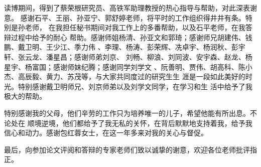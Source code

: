 读博期间，得到了蔡荣根研究员、高铁军助理教授的热心指导与帮助，对此深表谢意。
感谢石平、王丽、孙亚宁、郭舒婷老师，将平时的工作组织得井井有条。特别是孙老师，
在我担任秘书期间对我工作上的多番帮助，以及石平老师，在我答辩过程中给予的耐心
帮助。感谢师姐杨清、孙亚文和郭琦；感谢师兄胡建伟、钱鹏、戴卫明、王少江、季力伟
、李理、杨涛、彭荣辉、冼卓宇、杨润秋、彭宇轩、张云龙、潘星昌；感谢师弟刘京、
刘畅、柳浪、刘同波、安宇森、赵龙、杨星宇、杨富国；感谢师妹纪腾；感谢同学刘学文
、阮善明、贾伟、胡高科、陈小杰、高辰毅、黄力、苏茂等，与大家共同度过的研究生生
涯是一段如此美好的时光。特别感谢戴卫明师兄、刘京师弟以及刘学文同学，在学习和生
活中给予了我极大的帮助。

特别感谢我的父母，他们辛劳的工作只为培养唯一的儿子，希望他能有所出息。不论处在
顺境逆境，他们都给予了我无私的关怀，在背后默默地支持着我，给予我信心和动力。感谢包红蓉女士，在这一年多来对我的关心与督促。

最后，向参加论文评阅和答辩的专家老师们致以诚挚的谢意，欢迎各位老师批评指正。

\cleardoublepage[plain]%

